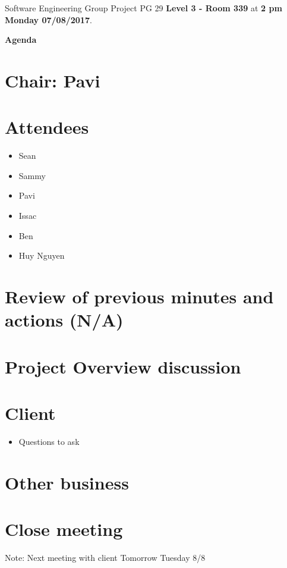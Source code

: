\documentclass[11pt, a4paper]{article}
\begin{document}
	\noindent Software Engineering Group Project PG 29 {\bf Level 3 - Room 339} at {\bf 2 pm Monday 07/08/2017}.
	\vspace*{10pt}
	\begin{center}
		\huge \bf Agenda
	\end{center}
	
	\section*{Chair: Pavi}
	
	\vspace*{10pt}
	
	\section{Attendees}
	\begin{itemize}
		\item Sean
		\item Sammy
		\item Pavi
		\item Issac
		\item Ben
		\item Huy Nguyen
	\end{itemize}
	
	\section{Review of previous minutes and actions (N/A)}
	
	\section{Project Overview discussion}
	
	\section{Client}
	\begin{itemize}
		\item Questions to ask
	\end{itemize}
	
	\section{Other business}
	
	\section {Close meeting}
	\vspace*{10pt}
	\noindent Note: Next meeting with client Tomorrow Tuesday 8/8
	
\end{document}
